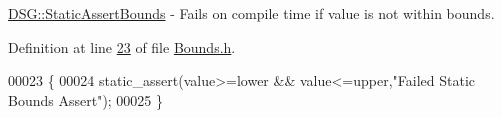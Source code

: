\hyperlink{namespace_d_s_g_a3fa12557d889e704f2e33d88929ec67a}{D\+S\+G\+::\+Static\+Assert\+Bounds} -\/ Fails on compile time if value is not within bounds. 



Definition at line \hyperlink{_bounds_8h_source_l00023}{23} of file \hyperlink{_bounds_8h_source}{Bounds.\+h}.


\begin{DoxyCode}
00023                              \{
00024         static\_assert(value>=lower && value<=upper,\textcolor{stringliteral}{"Failed Static Bounds Assert"});
00025     \}
\end{DoxyCode}
